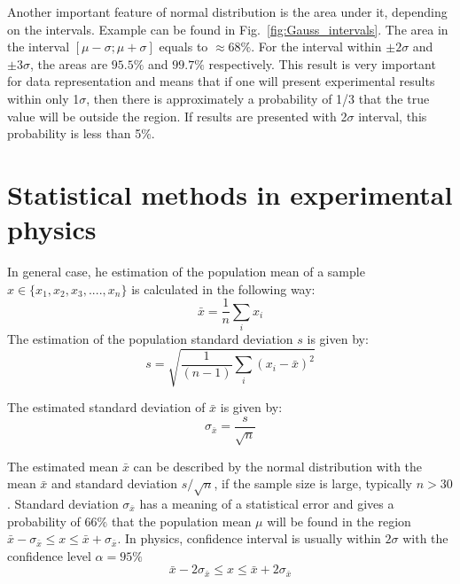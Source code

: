 \documentclass[12pt,a4paper]{report}
\begin{document}
Another important feature of normal distribution is the area under it, depending on the intervals. Example can be found in Fig.~\ref{fig:Gauss_intervals}. The area in the interval $[\mu-\sigma;\mu+\sigma]$ equals to $\approx 68\%$. For the interval within $\pm 2\sigma$ and $\pm 3\sigma$, the areas are $95.5\%$ and $99.7\%$ respectively. This result is very important for data representation and means that if one will present experimental results within only 1$\sigma$, then there is approximately a probability of 1/3 that the true value will be outside the region. If results are presented with 2$\sigma$ interval, this probability is less than 5\%.



\section{Statistical methods in experimental physics} \label{methods}

In general case, he estimation of the population mean of a sample $x \in \{ x_1, x_2, x_3, .... , x_n \}$ is calculated in the following way:
\begin{equation} \label{av_value}
\bar{x} = \frac{1}{n} \sum_ i {x_i}
\end{equation}
The estimation of the population standard deviation $s$ is given by:
\begin{equation}
s = \sqrt{\frac{1}{(n-1)} \sum_i {(x_i - \bar{x})^2}}
\end{equation}

The estimated standard deviation of $\bar{x}$ is given by:
\begin{equation} \label{standart_dev}
\sigma_{\bar{x}} = \frac{s}{ \sqrt{n} }
\end{equation}

The estimated mean $\bar{x}$ can be described by the normal distribution with the mean $\bar{x}$ and standard deviation $s / \sqrt{n}$, if the sample size is large, typically $n>30$.
Standard deviation $\sigma_{\bar{x}}$ has a meaning of a statistical error and gives a probability of 66$\%$ that the population mean $\mu$ will be found in the region $\bar{x} - \sigma_{\bar{x}} \le x \le \bar{x} + \sigma_{\bar{x}}$. In physics, confidence interval is usually within $2 \sigma$ with the confidence level $\alpha = 95 \%$
\begin{equation} \label{confidence_interval_large}
\bar{x} - 2 \sigma_{\bar{x}} \le x \le \bar{x} + 2 \sigma_{\bar{x}}
\end{equation}
\end{document}
